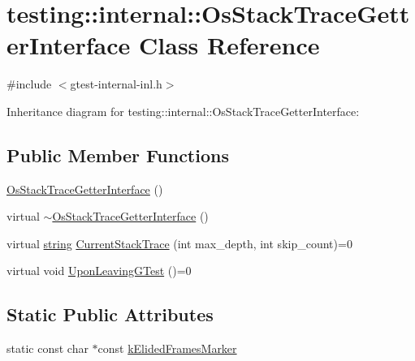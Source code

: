 \hypertarget{classtesting_1_1internal_1_1_os_stack_trace_getter_interface}{}\section{testing\+:\+:internal\+:\+:Os\+Stack\+Trace\+Getter\+Interface Class Reference}
\label{classtesting_1_1internal_1_1_os_stack_trace_getter_interface}


{\ttfamily \#include $<$gtest-\/internal-\/inl.\+h$>$}



Inheritance diagram for testing\+:\+:internal\+:\+:Os\+Stack\+Trace\+Getter\+Interface\+:
\subsection*{Public Member Functions}
\begin{DoxyCompactItemize}
\item 
\hyperlink{classtesting_1_1internal_1_1_os_stack_trace_getter_interface_afbe9eb0ca8775fbb98ff0720011b6708}{Os\+Stack\+Trace\+Getter\+Interface} ()
\item 
virtual \hyperlink{classtesting_1_1internal_1_1_os_stack_trace_getter_interface_a193f4a1de4af9b78010c659912df5a15}{$\sim$\+Os\+Stack\+Trace\+Getter\+Interface} ()
\item 
virtual \hyperlink{namespacetesting_1_1internal_a8e8ff5b11e64078831112677156cb111}{string} \hyperlink{classtesting_1_1internal_1_1_os_stack_trace_getter_interface_a6965eadb9b340808718fab9f1475c49a}{Current\+Stack\+Trace} (int max\+\_\+depth, int skip\+\_\+count)=0
\item 
virtual void \hyperlink{classtesting_1_1internal_1_1_os_stack_trace_getter_interface_a791bd120428b5a53d5eeba1b27296a39}{Upon\+Leaving\+G\+Test} ()=0
\end{DoxyCompactItemize}
\subsection*{Static Public Attributes}
\begin{DoxyCompactItemize}
\item 
static const char $\ast$const \hyperlink{classtesting_1_1internal_1_1_os_stack_trace_getter_interface_a669c49ce9ae05935e70bddb35a81ceb8}{k\+Elided\+Frames\+Marker}
\end{DoxyCompactItemize}


